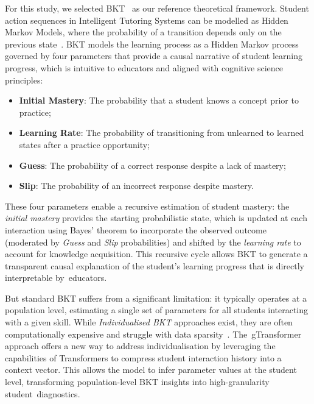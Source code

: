 \documentclass[applsci,article,accept,moreauthors,pdftex]{Definitions/mdpi}
\begin{document}
For this study, we selected BKT~\citep{corbett1994knowledge} as our reference theoretical framework. Student action sequences in Intelligent Tutoring Systems can be modelled as Hidden Markov Models, where the probability of a transition depends only on the previous state~\citep{Arnau-Gonzalez2025195}. BKT models the learning process as a Hidden Markov process governed by four parameters that provide a causal narrative of student learning progress, which is intuitive to educators and aligned with cognitive science principles:

\begin{itemize}
    \item \textbf{Initial Mastery}: The probability that a student knows a concept prior to practice; 
    \item \textbf{Learning Rate}: %
    The probability of transitioning from unlearned to learned states after a practice opportunity;
    \item \textbf{Guess}: The probability of a correct response despite a lack of mastery;
    \item \textbf{Slip}: The probability of an incorrect response despite mastery. 
\end{itemize}

These four parameters enable a recursive estimation of student mastery: the \textit{initial mastery} provides the starting probabilistic state, which is updated at each interaction using Bayes' theorem to incorporate the observed outcome (moderated by \textit{Guess} and \textit{Slip} probabilities) and shifted by the \textit{learning rate} to account for knowledge acquisition. This recursive cycle allows BKT to generate a transparent causal explanation of the student's learning progress that is directly interpretable by~educators.

But standard BKT suffers from a significant limitation: it typically operates at a population level, estimating a single set of parameters for all students interacting with a given skill. While \textit{{Individualised} BKT} approaches exist, they are often computationally expensive and struggle with data sparsity~\citep{yudelson2013individualized}. The~gTransformer approach offers a new way to address {individualisation} by leveraging the capabilities of Transformers to compress student interaction history into a context vector. This allows the model to infer parameter values at the student level, transforming population-level BKT insights into high-granularity student~diagnostics.
\end{document}
